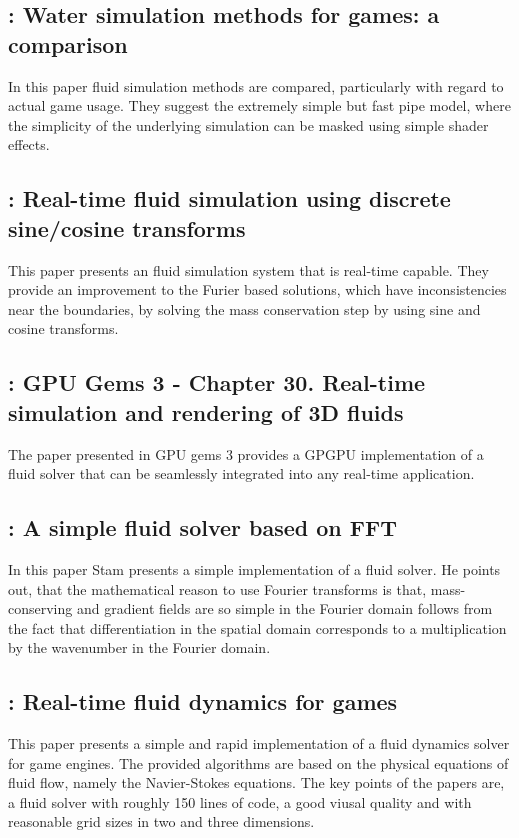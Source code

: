 \documentclass[11pt, a4paper]{article} %
\begin{document}
\subsection{\cite{Kellomaki:2012}: Water simulation methods for games: a comparison}
In this paper fluid simulation methods are compared, particularly with regard to actual game usage. They suggest the extremely simple but fast pipe model, where the simplicity of the underlying simulation can be masked using simple shader effects.

\subsection{\cite{Long:2009}: Real-time fluid simulation using discrete sine/cosine transforms}
This paper presents an fluid simulation system that is real-time capable. They provide an improvement to the Furier based solutions, which have inconsistencies near the boundaries, by solving the mass conservation step by using sine and cosine transforms.

\subsection{\cite{Nguyen:2007}: GPU Gems 3 - Chapter 30. Real-time simulation and rendering of 3D fluids}
The paper presented in GPU gems 3 provides a GPGPU implementation of a fluid solver that can be seamlessly integrated into any real-time application.

\subsection{\cite{Stam:2002}: A simple fluid solver based on FFT}
In this paper Stam presents a simple implementation of a fluid solver. He points out, that the mathematical reason to use Fourier transforms is that, mass-conserving and gradient fields are so simple in the Fourier domain follows from the fact that differentiation in the spatial domain corresponds to a multiplication by the wavenumber in the Fourier domain.

\subsection{\cite{Stam:2003}: Real-time fluid dynamics for games}
This paper presents a simple and rapid implementation of a fluid dynamics solver for game engines. The provided algorithms 
are based on the physical equations of fluid flow, namely the Navier-Stokes equations. 
The key points of the papers are, a fluid solver with roughly 150 lines of code, a good viusal quality and with reasonable grid sizes in two and three dimensions.
\end{document}
